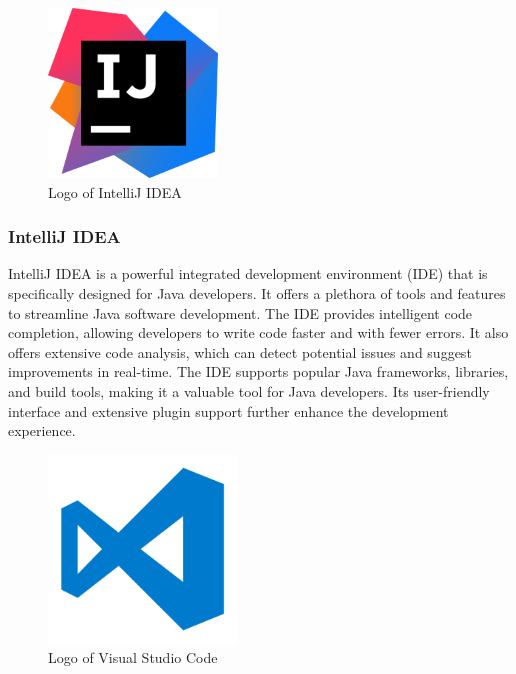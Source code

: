 \documentclass[conference]{IEEEtran}
\begin{document}
        \begin{figure}[htbp]
        \centerline{\includegraphics[width = 4.5cm]{Images/logo/intellij.png}}
        \label{fig}
        \caption{Logo of IntelliJ IDEA}
        \end{figure}
        \subsubsection{IntelliJ IDEA}
        IntelliJ IDEA is a powerful integrated development environment (IDE) that is specifically designed for Java developers. It offers a plethora of tools and features to streamline Java software development. The IDE provides intelligent code completion, allowing developers to write code faster and with fewer errors. It also offers extensive code analysis, which can detect potential issues and suggest improvements in real-time. The IDE supports popular Java frameworks, libraries, and build tools, making it a valuable tool for Java developers. Its user-friendly interface and extensive plugin support further enhance the development experience.\\
    
        \begin{figure}[htbp]
        \centerline{\includegraphics[width=5cm]{Images/logo/vsc.png}}
        \label{fig}
        \caption{Logo of Visual Studio Code}
        \end{figure}
\end{document}
